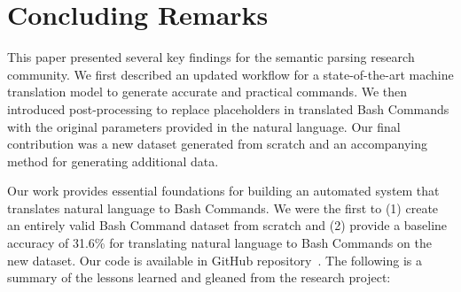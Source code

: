\documentclass{river-journal}
\begin{document}
\section{Concluding Remarks}
\label{conclusionfuturework}

This paper presented several key findings for the semantic parsing research community. We first described an updated workflow for a state-of-the-art machine translation model to generate accurate and practical commands. We then introduced post-processing to replace placeholders in translated Bash Commands with the original parameters provided in the natural language. Our final contribution was a new dataset generated from scratch and an accompanying method for generating additional data. 

Our work provides essential foundations for building an automated system that translates natural language to Bash Commands. We were the first to (1) create an entirely valid Bash Command dataset from scratch and (2) provide a baseline accuracy of 31.6\% for translating natural language to Bash Commands on the new dataset. Our code is available in GitHub repository~\cite{BashGen2022}. The following is a summary of the lessons learned and gleaned from the research project:
\end{document}
